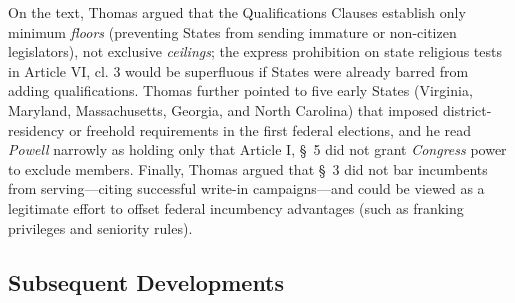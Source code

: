 \documentclass[12pt]{article}
\begin{document}
On the text, Thomas argued that the Qualifications Clauses establish only minimum \textit{floors} (preventing States from sending immature or non-citizen legislators), not exclusive \textit{ceilings}; the express prohibition on state religious tests in Article VI, cl. 3 would be superfluous if States were already barred from adding qualifications. Thomas further pointed to five early States (Virginia, Maryland, Massachusetts, Georgia, and North Carolina) that imposed district-residency or freehold requirements in the first federal elections, and he read \textit{Powell} narrowly as holding only that Article I, \S~5 did not grant \textit{Congress} power to exclude members. Finally, Thomas argued that \S~3 did not bar incumbents from serving---citing successful write-in campaigns---and could be viewed as a legitimate effort to offset federal incumbency advantages (such as franking privileges and seniority rules).

\subsection{Subsequent Developments}
\end{document}
